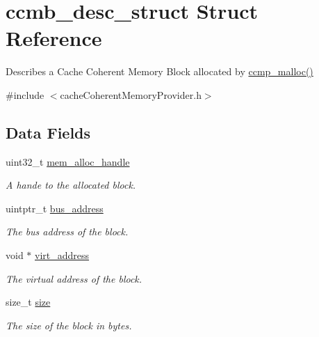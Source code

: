 \hypertarget{structccmb__desc__struct}{}\section{ccmb\+\_\+desc\+\_\+struct Struct Reference}
\label{structccmb__desc__struct}


Describes a Cache Coherent Memory Block allocated by \hyperlink{cacheCoherentMemoryProvider_8c_a72b3227fd1265a06a6b65e36b4c370ee}{ccmp\+\_\+malloc()}  




{\ttfamily \#include $<$cache\+Coherent\+Memory\+Provider.\+h$>$}

\subsection*{Data Fields}
\begin{DoxyCompactItemize}
\item 
uint32\+\_\+t \hyperlink{structccmb__desc__struct_a00cc7eaf94938d140481affeef8e0909}{mem\+\_\+alloc\+\_\+handle}\hypertarget{structccmb__desc__struct_a00cc7eaf94938d140481affeef8e0909}{}\label{structccmb__desc__struct_a00cc7eaf94938d140481affeef8e0909}

\begin{DoxyCompactList}\small\item\em A hande to the allocated block. \end{DoxyCompactList}\item 
uintptr\+\_\+t \hyperlink{structccmb__desc__struct_a30b6007ecbb4528361a724f8aed124df}{bus\+\_\+address}\hypertarget{structccmb__desc__struct_a30b6007ecbb4528361a724f8aed124df}{}\label{structccmb__desc__struct_a30b6007ecbb4528361a724f8aed124df}

\begin{DoxyCompactList}\small\item\em The bus address of the block. \end{DoxyCompactList}\item 
void $\ast$ \hyperlink{structccmb__desc__struct_a849fdbceb8080e18a11878131c25808f}{virt\+\_\+address}\hypertarget{structccmb__desc__struct_a849fdbceb8080e18a11878131c25808f}{}\label{structccmb__desc__struct_a849fdbceb8080e18a11878131c25808f}

\begin{DoxyCompactList}\small\item\em The virtual address of the block. \end{DoxyCompactList}\item 
size\+\_\+t \hyperlink{structccmb__desc__struct_a0bd1b903e5eb8f13d33c27fdf77bfbde}{size}\hypertarget{structccmb__desc__struct_a0bd1b903e5eb8f13d33c27fdf77bfbde}{}\label{structccmb__desc__struct_a0bd1b903e5eb8f13d33c27fdf77bfbde}

\begin{DoxyCompactList}\small\item\em The size of the block in bytes. \end{DoxyCompactList}\end{DoxyCompactItemize}



